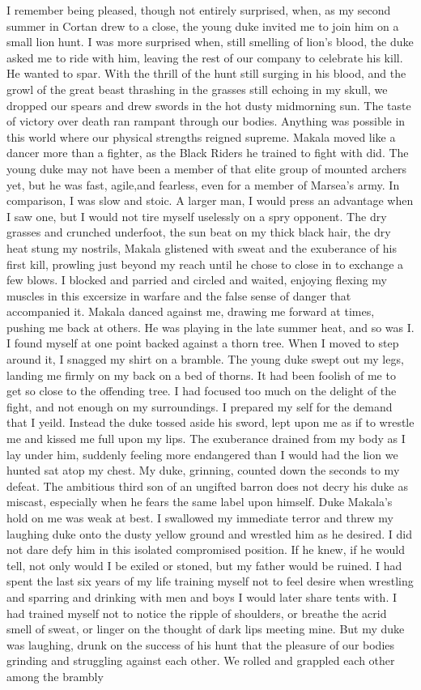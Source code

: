 \documentclass{article}
\begin{document}
I remember being pleased, though not entirely surprised, when, as my second summer in Cortan drew to a close, the young duke invited me to join him on a small lion hunt. I was more surprised when, still smelling of lion's blood, the duke asked me to ride with him, leaving the rest of our company to celebrate his kill. He wanted to spar. With the thrill of the hunt still surging in his blood, and the growl of the great beast thrashing in the grasses still echoing in my skull, we dropped our spears and drew swords in the hot dusty midmorning sun. The taste of victory over death ran rampant through our bodies. Anything was possible in this world where our physical strengths reigned supreme. Makala moved like a dancer more than a fighter, as the Black Riders he trained to fight with did. The young duke may not have been a member of that elite group of mounted archers yet, but he was fast, agile,and fearless, even for a member of Marsea's army. In comparison, I was slow and stoic. A larger man, I would press an advantage when I saw one, but I would not tire myself uselessly on a spry opponent. The dry grasses and crunched underfoot, the sun beat on my thick black hair, the dry heat stung my nostrils, Makala glistened with sweat and the exuberance of his first kill, prowling just beyond my reach until he chose to close in to exchange a few blows. I blocked and parried and circled and waited, enjoying flexing my muscles in this excersize in warfare and the false sense of danger that accompanied it. Makala danced against me, drawing me forward at times, pushing me back at others. He was playing in the late summer heat, and so was I. I found myself at one point backed against a thorn tree. When I moved to step around it, I snagged my shirt on a bramble. The young duke swept out my legs, landing me firmly on my back on a bed of thorns. It had been foolish of me to get so close to the offending tree. I had focused too much on the delight of the fight, and not enough on my surroundings. I prepared my self for the demand that I yeild. Instead the duke tossed aside his sword, lept upon me as if to wrestle me and kissed me full upon my lips. The exuberance drained from my body as I lay under him, suddenly feeling more endangered than I would  had the lion we hunted sat atop my chest. My duke, grinning, counted down the seconds to my defeat. The ambitious third son of an ungifted barron does not decry his duke as miscast, especially when he fears the same label upon himself. Duke Makala's hold on me was weak at best. I swallowed my immediate terror and threw my laughing duke onto the dusty yellow ground and wrestled him as he desired. I did not dare defy him in this isolated compromised position. If he knew, if he would tell, not only would I be exiled or stoned, but my father would be ruined. I had spent the last six years of my life training myself not to feel desire when wrestling and sparring and drinking with men and boys I would later share tents with. I had trained myself not to notice the ripple of shoulders, or breathe the acrid smell of sweat, or linger on the thought of dark lips meeting mine. But my duke was laughing, drunk on the success of his hunt that the pleasure of our bodies grinding and struggling against each other. We rolled and grappled each other among the brambly 
\end{document}
